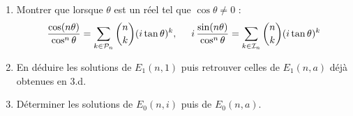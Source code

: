 \begin{enumerate}
\begin{enumerate}
 \item Montrer que lorsque $\theta$ est un réel tel que $\cos \theta \neq 0$ :
\begin{displaymath}
 \frac{\cos(n\theta)}{\cos ^n \theta} = \sum_{k\in \mathcal P _n} \binom{n}{k} (i \tan \theta )^{k}, \hspace{0.5cm}
 i\,\frac{\sin(n\theta)}{\cos ^n \theta} = \sum_{k\in \mathcal I _n} \binom{n}{k} (i\tan \theta)^k
\end{displaymath}
\item En déduire les solutions de $E_1(n,1)$ puis retrouver celles de $E_1(n,a)$ déjà obtenues en 3.d.
 \item Déterminer les solutions de $E_0(n,i)$ puis de $E_0(n,a)$.
\end{enumerate}

\end{enumerate}


